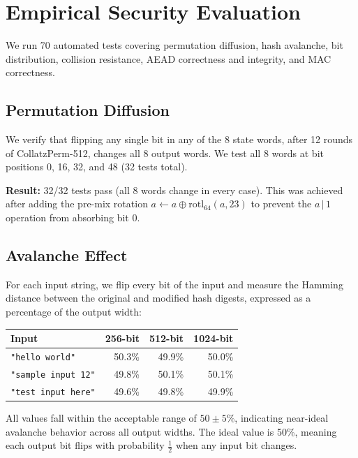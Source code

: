 \documentclass[11pt,a4paper]{article}
\newcommand{\toprule}{\hline}
\newcommand{\midrule}{\hline}
\newcommand{\bottomrule}{\hline}
\newcommand{\rotl}{\mathrm{rotl}_{64}}
\begin{document}
\section{Empirical Security Evaluation}
\label{sec:security}

We run 70 automated tests covering permutation diffusion, hash
avalanche, bit distribution, collision resistance, AEAD correctness and
integrity, and MAC correctness.

\subsection{Permutation Diffusion}
\label{sec:diffusion}

We verify that flipping any single bit in any of the 8 state words,
after 12 rounds of CollatzPerm-512, changes all 8 output words. We test
all 8 words at bit positions 0, 16, 32, and 48 (32 tests total).

\textbf{Result:} 32/32 tests pass (all 8 words change in every case).
This was achieved after adding the pre-mix rotation
$a \leftarrow a \oplus \rotl(a, 23)$ to prevent the $a \,|\, 1$
operation from absorbing bit 0.

\subsection{Avalanche Effect}

For each input string, we flip every bit of the input and measure the
Hamming distance between the original and modified hash digests,
expressed as a percentage of the output width:

\begin{center}
\begin{tabular}{|l|r|r|r|}
\toprule
\textbf{Input} & \textbf{256-bit} & \textbf{512-bit} & \textbf{1024-bit} \\
\midrule
\texttt{"hello world"}    & 50.3\% & 49.9\% & 50.0\% \\
\texttt{"sample input 12"} & 49.8\% & 50.1\% & 50.1\% \\
\texttt{"test input here"} & 49.6\% & 49.8\% & 49.9\% \\
\bottomrule
\end{tabular}
\end{center}

All values fall within the acceptable range of $50 \pm 5\%$, indicating
near-ideal avalanche behavior across all output widths. The ideal value
is 50\%, meaning each output bit flips with probability $\frac{1}{2}$
when any input bit changes.
\end{document}
